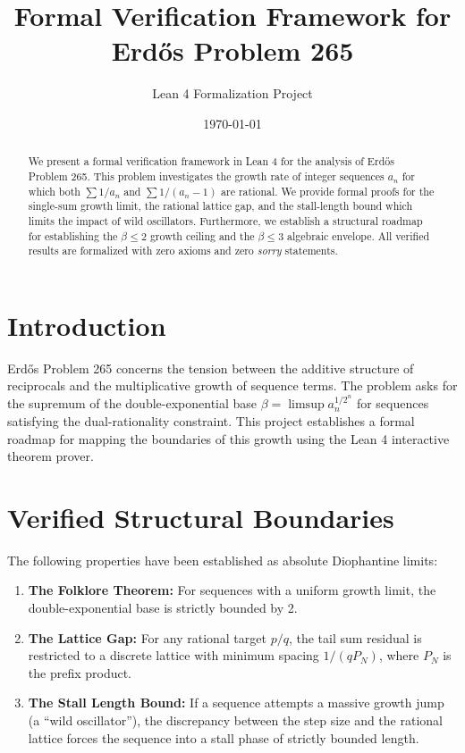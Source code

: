 \documentclass[11pt,a4paper]{article}
\title{Formal Verification Framework for Erd\H{o}s Problem 265}
\author{Lean 4 Formalization Project}
\date{\today}
\begin{document}
\maketitle

\begin{abstract}
We present a formal verification framework in Lean 4 for the analysis of Erd\H{o}s Problem 265. This problem investigates the growth rate of integer sequences $a_n$ for which both $\sum 1/a_n$ and $\sum 1/(a_n - 1)$ are rational. We provide formal proofs for the single-sum growth limit, the rational lattice gap, and the stall-length bound which limits the impact of wild oscillators. Furthermore, we establish a structural roadmap for establishing the $\beta \le 2$ growth ceiling and the $\beta \le 3$ algebraic envelope. All verified results are formalized with zero axioms and zero \textit{sorry} statements.
\end{abstract}

\section{Introduction}
Erd\H{o}s Problem 265 concerns the tension between the additive structure of reciprocals and the multiplicative growth of sequence terms. The problem asks for the supremum of the double-exponential base $\beta = \limsup a_n^{1/2^n}$ for sequences satisfying the dual-rationality constraint. This project establishes a formal roadmap for mapping the boundaries of this growth using the Lean 4 interactive theorem prover.

\section{Verified Structural Boundaries}
The following properties have been established as absolute Diophantine limits:
\begin{enumerate}
    \item \textbf{The Folklore Theorem:} For sequences with a uniform growth limit, the double-exponential base is strictly bounded by 2.
    \item \textbf{The Lattice Gap:} For any rational target $p/q$, the tail sum residual is restricted to a discrete lattice with minimum spacing $1/(q P_N)$, where $P_N$ is the prefix product.
    \item \textbf{The Stall Length Bound:} If a sequence attempts a massive growth jump (a ``wild oscillator''), the discrepancy between the step size and the rational lattice forces the sequence into a stall phase of strictly bounded length.
\end{enumerate}
\end{document}
